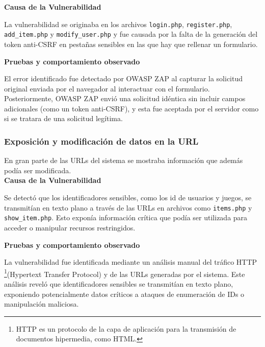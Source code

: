 \documentclass[a4paper,12pt]{article}
\newcommand{\code}[1]{\texttt{#1}}  %
\begin{document}
\textbf{Causa de la Vulnerabilidad}

La vulnerabilidad se originaba en los archivos \code{login.php}, \code{register.php}, \code{add\_item.php} y \code{modify\_user.php} y fue causada por la falta de la generación del token anti-CSRF en pestañas sensibles en las que hay que rellenar un formulario.

\vspace{1em}

\textbf{Pruebas y comportamiento observado}

El error identificado fue detectado por OWASP ZAP al capturar la solicitud original enviada por el navegador al interactuar con el formulario. Posteriormente, OWASP ZAP envió una solicitud idéntica sin incluir campos adicionales (como un token anti-CSRF), y esta fue aceptada por el servidor como si se tratara de una solicitud legítima.

\vspace{1em}

\subsubsection{Exposición y modificación de datos en la URL}

En gran parte de las URLs del sistema se mostraba información que además podía ser modificada.\\

\textbf{Causa de la Vulnerabilidad}

Se detectó que los identificadores sensibles, como los id de usuarios y juegos, se transmitían en texto plano a través de las URLs en archivos como \code{items.php} y \code{show\_item.php}. Esto exponía información crítica que podía ser utilizada para acceder o manipular recursos restringidos.
\vspace{1em}

\textbf{Pruebas y comportamiento observado}

La vulnerabilidad fue identificada mediante un análisis manual del tráfico HTTP \footnote{HTTP es un protocolo de la capa de aplicación para la transmisión de documentos hipermedia, como HTML.}(Hypertext Transfer Protocol) y de las URLs generadas por el sistema. Este análisis reveló que identificadores sensibles se transmitían en texto plano, exponiendo potencialmente datos críticos a ataques de enumeración de IDs o manipulación maliciosa.

\vspace{1em}
\newpage
\end{document}
